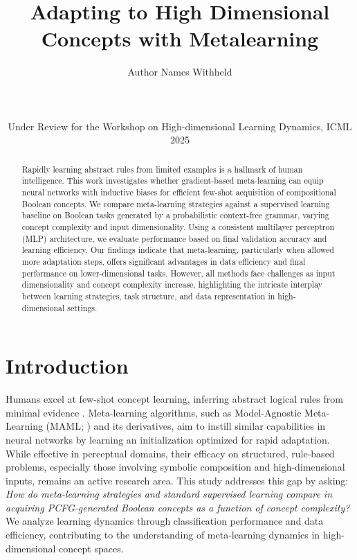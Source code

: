 \documentclass{article}
\title{Adapting to High Dimensional Concepts with Metalearning}
\author{%
  Author Names Withheld \\\\\\\\ %
  Under Review for the Workshop on High-dimensional Learning Dynamics, ICML 2025
}
\date{} %
\begin{document}
\maketitle

\begin{abstract}
Rapidly learning abstract rules from limited examples is a hallmark of human intelligence. This work investigates whether gradient-based meta-learning can equip neural networks with inductive biases for efficient few-shot acquisition of compositional Boolean concepts. We compare meta-learning strategies against a supervised learning baseline on Boolean tasks generated by a probabilistic context-free grammar, varying concept complexity and input dimensionality. Using a consistent multilayer perceptron (MLP) architecture, we evaluate performance based on final validation accuracy and learning efficiency. Our findings indicate that meta-learning, particularly when allowed more adaptation steps, offers significant advantages in data efficiency and final performance on lower-dimensional tasks. However, all methods face challenges as input dimensionality and concept complexity increase, highlighting the intricate interplay between learning strategies, task structure, and data representation in high-dimensional settings.
\end{abstract}

\section{Introduction}
Humans excel at few-shot concept learning, inferring abstract logical rules from minimal evidence \citep{Lake2015bpl}. Meta-learning algorithms, such as Model-Agnostic Meta-Learning (MAML; \citealp{Finn2017maml}) and its derivatives, aim to instill similar capabilities in neural networks by learning an initialization optimized for rapid adaptation. While effective in perceptual domains, their efficacy on structured, rule-based problems, especially those involving symbolic composition and high-dimensional inputs, remains an active research area. This study addresses this gap by asking: \emph{How do meta-learning strategies and standard supervised learning compare in acquiring PCFG-generated Boolean concepts as a function of concept complexity?} We analyze learning dynamics through classification performance and data efficiency, contributing to the understanding of meta-learning dynamics in high-dimensional concept spaces.
\end{document}
